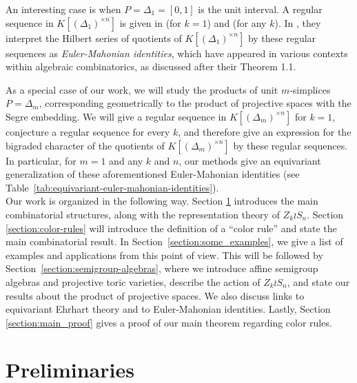 \documentclass[a4paper,12pt]{amsart}
\theoremstyle{plain}
\theoremstyle{definition}
\theoremstyle{remark}
\begin{document}
An interesting case is when $P= \Delta_1 = [0,1]$ is the unit interval. A regular sequence in $K[(\Delta_1)^{\times n}]$ is given in \cite{adeyemo-szendroi-refined} (for $k=1$) and \cite{braun-olsen-statistics} (for any $k$). In \cite{braun-olsen-statistics}, they interpret the Hilbert series of quotients of $K[(\Delta_1)^{\times n}]$ by these regular sequences as \emph{Euler-Mahonian identities}, which have appeared in various contexts within algebraic combinatorics, as discussed after their Theorem 1.1. 

As a special case of our work, we will study the products of unit $m$-simplices $P = \Delta_m$, corresponding geometrically to the product of projective spaces with the Segre embedding. We will give a regular sequence in $K[(\Delta_m)^{\times n}]$ for $k=1$, conjecture a regular sequence for every $k$, and therefore give an expression for the bigraded character of the quotients of $K[(\Delta_m)^{\times n}]$ by these regular sequences.
In particular, for $m=1$ and any $k$ and $n$, our methods give an equivariant generalization of these aforementioned Euler-Mahonian identities (see Table~\ref{tab:equivariant-euler-mahonian-identities}). %
\\

Our work is organized in the following way. Section \ref{section:Preliminaries} introduces the main combinatorial structures, along with the representation theory of $Z_k \wr S_n$. Section \ref{section:color-rules} will introduce the definition of a ``color rule'' and state the main combinatorial result. In Section~\ref{section:some_examples}, we give a list of examples and applications from this point of view.
This will be followed by Section~\ref{section:semigroup-algebras}, where we introduce affine semigroup algebras and projective toric varieties, describe the action of $Z_k \wr S_n$, and state our results about the product of projective spaces. We also discuss links to equivariant Ehrhart theory and to Euler-Mahonian identities.
Lastly, Section \ref{section:main_proof} gives a proof of our main theorem regarding color rules.

\section{Preliminaries} \label{section:Preliminaries}
\end{document}
